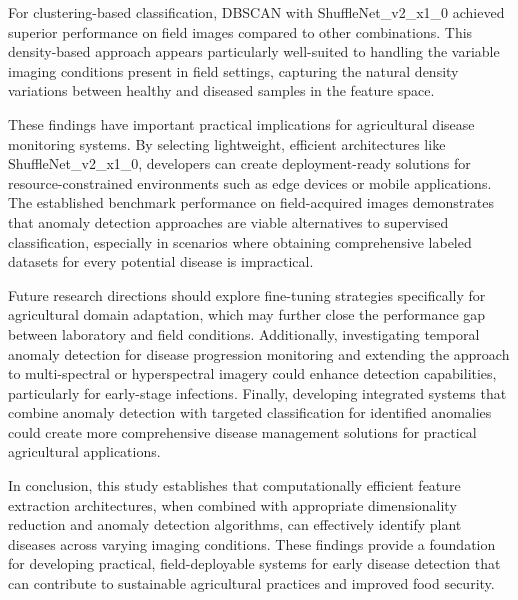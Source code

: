 \documentclass[12pt,a4paper,oneside]{report}
\begin{document}
For clustering-based classification, DBSCAN with ShuffleNet\_v2\_x1\_0 achieved superior performance on field images compared to other combinations. This density-based approach appears particularly well-suited to handling the variable imaging conditions present in field settings, capturing the natural density variations between healthy and diseased samples in the feature space.

These findings have important practical implications for agricultural disease monitoring systems. By selecting lightweight, efficient architectures like ShuffleNet\_v2\_x1\_0, developers can create deployment-ready solutions for resource-constrained environments such as edge devices or mobile applications. The established benchmark performance on field-acquired images demonstrates that anomaly detection approaches are viable alternatives to supervised classification, especially in scenarios where obtaining comprehensive labeled datasets for every potential disease is impractical.

Future research directions should explore fine-tuning strategies specifically for agricultural domain adaptation, which may further close the performance gap between laboratory and field conditions. Additionally, investigating temporal anomaly detection for disease progression monitoring and extending the approach to multi-spectral or hyperspectral imagery could enhance detection capabilities, particularly for early-stage infections. Finally, developing integrated systems that combine anomaly detection with targeted classification for identified anomalies could create more comprehensive disease management solutions for practical agricultural applications.

In conclusion, this study establishes that computationally efficient feature extraction architectures, when combined with appropriate dimensionality reduction and anomaly detection algorithms, can effectively identify plant diseases across varying imaging conditions. These findings provide a foundation for developing practical, field-deployable systems for early disease detection that can contribute to sustainable agricultural practices and improved food security.



\end{document}
